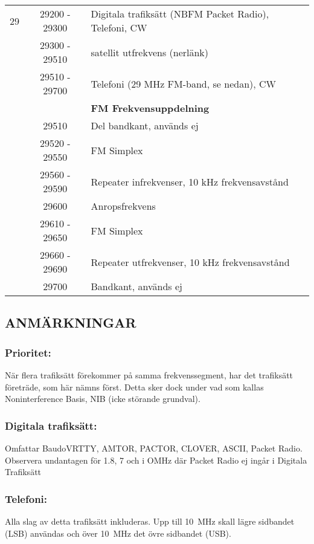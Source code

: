 \begin{longtable}{lcl}
29   & 29200 - 29300 & Digitala trafiksätt (NBFM Packet Radio), Telefoni, CW \\
     & 29300 - 29510 & satellit utfrekvens (nerlänk) \\
     & 29510 - 29700 & Telefoni (29 MHz FM-band, se nedan), CW \\
     &               & \textbf{FM Frekvensuppdelning} \\
     & 29510         & Del bandkant, används ej \\
     & 29520 - 29550 & FM Simplex \\
     & 29560 - 29590 & Repeater infrekvenser, 10 kHz frekvensavstånd \\
     & 29600         & Anropsfrekvens \\
     & 29610 - 29650 & FM Simplex \\
     & 29660 - 29690 & Repeater utfrekvenser, 10 kHz frekvensavstånd \\
     & 29700         & Bandkant, används ej \\
\end{longtable}

\subsection{ANMÄRKNINGAR}

\subsubsection{Prioritet:}

När flera trafiksätt förekommer på samma frekvenssegment, har det
trafiksätt företräde, som här nämns först. Detta sker dock under
vad som kallas Noninterference Basis, NIB (icke störande grundval).

\subsubsection{Digitala trafiksätt:}

Omfattar BaudoVRTTY, AMTOR, PACTOR, CLOVER, ASCII, Packet Radio.
Observera undantagen för 1.8, 7 och i OMHz där Packet Radio ej
ingår i Digitala Trafiksätt

\subsubsection{Telefoni:}

Alla slag av detta trafiksätt inkluderas. Upp till 10~MHz
skall lägre sidbandet (LSB) användas och över 10~MHz
det övre sidbandet (USB).

